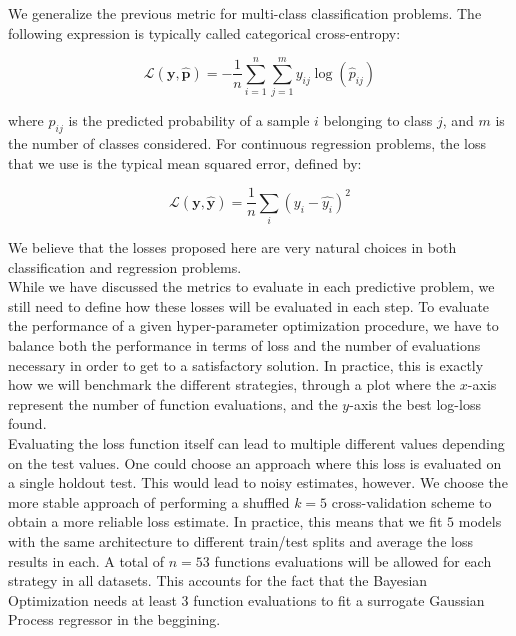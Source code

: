 \documentclass[10pt,a4paper,twoside]{book}
\begin{document}
We generalize the previous metric for multi-class classification problems. The following expression is typically called categorical cross-entropy:

\begin{equation}
\mathcal{L}(\boldsymbol{y}, \boldsymbol{\hat{p}}) = - \dfrac{1}{n} \sum_{i=1}^n\sum_{j=1}^m y_{ij}\log(\hat{p}_{ij})
\end{equation}

where $\hat{p}_{ij}$ is the predicted probability of a sample $i$ belonging to class $j$, and $m$ is the number of classes considered. For continuous regression problems, the loss that we use is the typical mean squared error, defined by:

\begin{equation}
\mathcal{L}(\boldsymbol{y}, \boldsymbol{\hat{y}}) = \dfrac{1}{n} \sum_i \left(y_i - \hat{y_i}\right)^2
\end{equation}

We believe that the losses proposed here are very natural choices in both classification and regression problems.\\

While we have discussed the metrics to evaluate in each predictive problem, we still need to define how these losses will be evaluated in each step. To evaluate the performance of a given hyper-parameter optimization procedure, we have to balance both the performance in terms of loss and the number of evaluations necessary in order to get to a satisfactory solution. In practice, this is exactly how we will benchmark the different strategies, through a plot where the $x$-axis represent the number of function evaluations, and the $y$-axis the best log-loss found.\\

Evaluating the loss function itself can lead to multiple different values depending on the test values. One could choose an approach where this loss is evaluated on a single holdout test. This would lead to noisy estimates, however. We choose the more stable approach of performing a shuffled $k=5$ cross-validation scheme to obtain a more reliable loss estimate. In practice, this means that we fit $5$ models with the same architecture to different train/test splits and average the loss results in each. A total of $n=53$ functions evaluations will be allowed for each strategy in all datasets. This accounts for the fact that the Bayesian Optimization needs at least $3$ function evaluations to fit a surrogate Gaussian Process regressor in the beggining.
\end{document}
